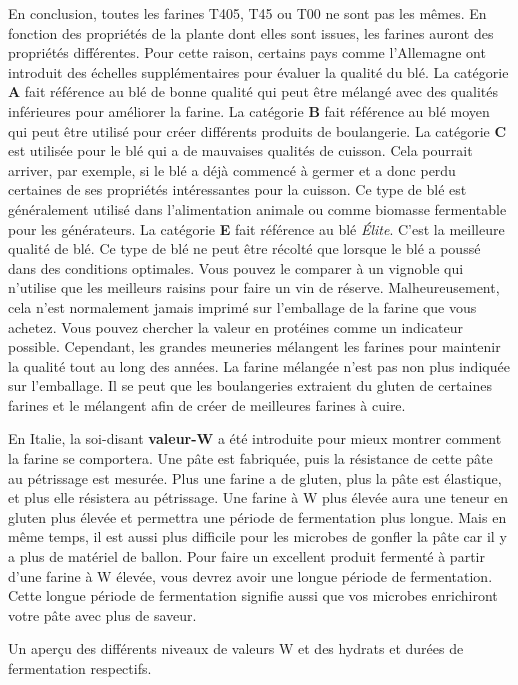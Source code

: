 En conclusion, toutes les farines T405, T45 ou T00 ne sont pas les mêmes. En fonction des propriétés de la plante dont elles sont issues, les farines auront des propriétés différentes. Pour cette raison, certains pays comme l'Allemagne ont introduit des échelles supplémentaires pour évaluer la qualité du blé. La catégorie \textbf{A} fait référence au blé de bonne qualité qui peut être mélangé avec des qualités inférieures pour améliorer la farine. La catégorie \textbf{B} fait référence au blé moyen qui peut être utilisé pour créer différents produits de boulangerie. La catégorie \textbf{C} est utilisée pour le blé qui a de mauvaises qualités de cuisson. Cela pourrait arriver, par exemple, si le blé a déjà commencé à germer et a donc perdu certaines de ses propriétés intéressantes pour la cuisson. Ce type de blé est généralement utilisé dans l'alimentation animale ou comme biomasse fermentable pour les générateurs. La catégorie \textbf{E} fait référence au blé \emph{Élite}. C'est la meilleure qualité de blé. Ce type de blé ne peut être récolté que lorsque le blé a poussé dans des conditions optimales. Vous pouvez le comparer à un vignoble qui n'utilise que les meilleurs raisins pour faire un vin de réserve. Malheureusement, cela n'est normalement jamais imprimé sur l'emballage de la farine que vous achetez. Vous pouvez chercher la valeur en protéines comme un indicateur possible. Cependant, les grandes meuneries mélangent les farines pour maintenir la qualité tout au long des années. La farine mélangée n'est pas non plus indiquée sur l'emballage. Il se peut que les boulangeries extraient du gluten de certaines farines et le mélangent afin de créer de meilleures farines à cuire.

En Italie, la soi-disant \textbf{valeur-W} a été introduite pour mieux montrer comment la farine se comportera. Une pâte est fabriquée, puis la résistance de cette pâte au pétrissage est mesurée. Plus une farine a de gluten, plus la pâte est élastique, et plus elle résistera au pétrissage. Une farine à W plus élevée aura une teneur en gluten plus élevée et permettra une période de fermentation plus longue. Mais en même temps, il est aussi plus difficile pour les microbes de gonfler la pâte car il y a plus de matériel de ballon. Pour faire un excellent produit fermenté à partir d'une farine à W élevée, vous devrez avoir une longue période de fermentation. Cette longue période de fermentation signifie aussi que vos microbes enrichiront votre pâte avec plus de saveur.

\begin{table}[!htb]
    \begin{center}
        
        \caption[Durée de fermentation versus valeur-W]{Un aperçu des différents
            niveaux de valeurs W et des hydrats et durées de fermentation respectifs.}%
        \label{tab:w-value}
    \end{center}
\end{table}


